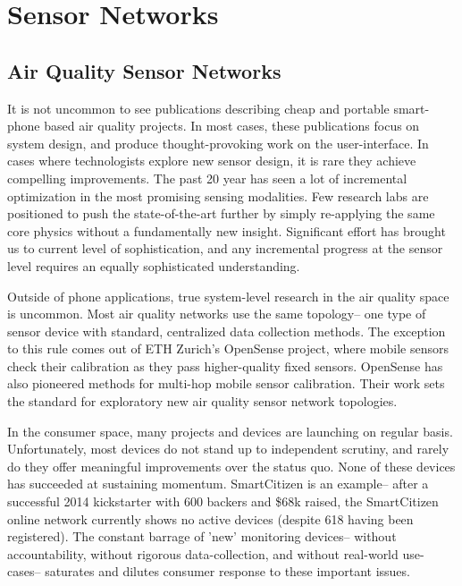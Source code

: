 \section{Sensor Networks}

\subsection{Air Quality Sensor Networks}

It is not uncommon to see publications describing cheap and portable smart-phone based air quality projects.  In most cases, these publications focus on system design, and produce thought-provoking work on the user-interface.  In cases where technologists explore new sensor design, it is rare they achieve compelling improvements.  The past 20 year has seen a lot of incremental optimization in the most promising sensing modalities.  Few research labs are positioned to push the state-of-the-art further by simply re-applying the same core physics without a fundamentally new insight.  Significant effort has brought us to current level of sophistication, and any incremental progress at the sensor level requires an equally sophisticated understanding.   

Outside of phone applications, true system-level research in the air quality space is uncommon.  Most air quality networks use the same topology-- one type of sensor device with standard, centralized data collection methods.  The exception to this rule comes out of ETH Zurich's OpenSense project, where mobile sensors check their calibration as they pass higher-quality fixed sensors.  OpenSense has also pioneered methods for multi-hop mobile sensor calibration.  Their work sets the standard for exploratory new air quality sensor network topologies.

In the consumer space, many projects and devices are launching on regular basis.  Unfortunately, most devices do not stand up to independent scrutiny, and rarely do they offer meaningful improvements over the status quo.  None of these devices has succeeded at sustaining momentum.  SmartCitizen is an example-- after a successful 2014 kickstarter with 600 backers and \$68k raised, the SmartCitizen online network currently shows no active devices (despite 618 having been registered).  The constant barrage of 'new' monitoring devices-- without accountability, without rigorous data-collection, and without real-world use-cases-- saturates and dilutes consumer response to these important issues.   

